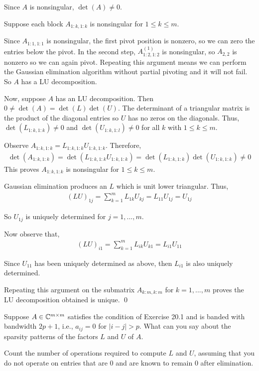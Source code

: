\documentclass[10pt]{article}
\begin{document}
\begin{solution}[Solution]
Since \( A \) is nonsingular, \( \det(A)\neq 0 \). 

Suppose each block \( A_{1:k,1:k} \) is nonsingular for \( 1\leq k\leq m \).

Since \( A_{1:1,1:1} \) is nonsingular, the first pivot position is nonzero, so we can zero the entries below the pivot. In the second step, \( A^{(1)}_{1:2,1:2} \) is nonsingular, so \( A_{2,2} \) is nonzero so we can again pivot. Repeating this argument means we can perform the Gaussian elimination algorithm without partial pivoting and it will not fail.  So \( A \) has a LU decomposition.


Now, suppose \( A \) has an LU decomposition. Then \( 0\neq \det(A) = \det(L)\det(U) \). The determinant of a triangular matrix is the product of the diagonal entries so \( U \) has no zeros on the diagonals. Thus, \( \det(L_{1:k,1:k})\neq 0 \) and \( \det(U_{1:k,1:l})\neq 0 \) for all \( k \) with \( 1\leq k\leq m \).

Observe \( A_{1:k,1:k} = L_{1:k,1:k} U_{1:k,1:k} \). Therefore,
    \begin{align*}
        \det(A_{1:k,1:k}) = \det(L_{1:k,1:k} U_{1:k,1:k}) = \det(L_{1:k,1:k})\det(U_{1:k,1:k})\neq 0
    \end{align*}
This proves \( A_{1:k,1:k} \) is nonsingular for \( 1\leq k\leq m \).


Gaussian elimination produces an \( L \) which is unit lower triangular. Thus,
\begin{align*}
    (LU)_{1j} = \sum_{k=1}^{m}L_{1k}U_{kj} = L_{11}U_{1j} = U_{1j}
\end{align*}

So \( U_{1j} \) is uniquely determined for \( j=1, ..., m \).

Now observe that,
\begin{align*}
    (LU)_{i1} = \sum_{k=1}^{m}L_{ik}U_{k1} = L_{i1}U_{11}
\end{align*}

Since \( U_{11} \) has been uniquely determined as above, then \( L_{i1} \) is also uniquely determined. 

Repeating this argument on the submatrix \( A_{k:m,k:m} \) for \( k=1, ..., m \) proves the LU decomposition obtained is unique. \qed

\end{solution}

\begin{problem}[Exercise 20.2]
 Suppose \( A\in\mathbb{C}^{m\times m} \) satisfies the condition of Exercise 20.1 and is banded with bandwidth \( 2p+1 \), i.e., \( a_{ij}=0 \) for \( |i-j|>p \). What can you say about the sparsity patterns of the factors \( L \) and \( U \) of \( A \).

Count the number of operations required to compute \(L\) and \(U\), assuming that you do not operate on entries that are \(0\) and are known to remain \(0\) after elimination.
\end{problem}
\end{document}

